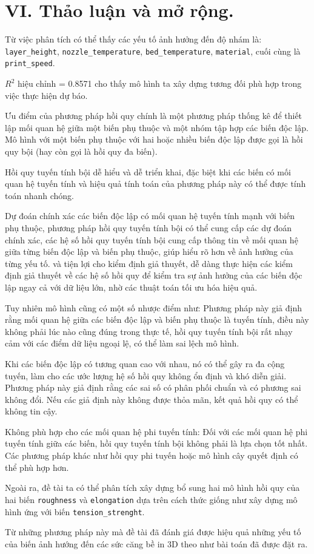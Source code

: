 \section{VI. Thảo luận và mở
rộng.}\label{vi.-thux1ea3o-luux1eadn-vuxe0-mux1edf-rux1ed9ng.}

Từ việc phân tích có thể thấy các yếu tố ảnh hưởng đến độ nhám là:
\texttt{layer\_height}, \texttt{nozzle\_temperature},
\texttt{bed\_temperature}, \texttt{material}, cuối cùng là
\texttt{print\_speed}.

\(R^2\) hiệu chỉnh = 0.8571 cho thấy mô hình ta xây dựng tương đối phù
hợp trong việc thực hiện dự báo.

Ưu điểm của phương pháp hồi quy chính là một phương pháp thống kê để
thiết lập mối quan hệ giữa một biến phụ thuộc và một nhóm tập hợp các
biến độc lập. Mô hình với một biến phụ thuộc với hai hoặc nhiều biến độc
lập được gọi là hồi quy bội (hay còn gọi là hồi quy đa biến).

Hồi quy tuyến tính bội dễ hiểu và dễ triển khai, đặc biệt khi các biến
có mối quan hệ tuyến tính và hiệu quả tính toán của phương pháp này có
thể được tính toán nhanh chóng.

Dự đoán chính xác các biến độc lập có mối quan hệ tuyến tính mạnh với
biến phụ thuộc, phương pháp hồi quy tuyến tính bội có thể cung cấp các
dự đoán chính xác, các hệ số hồi quy tuyến tính bội cung cấp thông tin
về mối quan hệ giữa từng biến độc lập và biến phụ thuộc, giúp hiểu rõ
hơn về ảnh hưởng của từng yếu tố. và tiện lợi cho kiểm định giả thuyết,
dễ dàng thực hiện các kiểm định giả thuyết về các hệ số hồi quy để kiểm
tra sự ảnh hưởng của các biến độc lập ngay cả với dữ liệu lớn, nhờ các
thuật toán tối ưu hóa hiệu quả.

Tuy nhiên mô hình cũng có một số nhược điểm như: Phương pháp này giả
định rằng mối quan hệ giữa các biến độc lập và biến phụ thuộc là tuyến
tính, điều này không phải lúc nào cũng đúng trong thực tế, hồi quy tuyến
tính bội rất nhạy cảm với các điểm dữ liệu ngoại lệ, có thể làm sai lệch
mô hình.

Khi các biến độc lập có tương quan cao với nhau, nó có thể gây ra đa
cộng tuyến, làm cho các ước lượng hệ số hồi quy không ổn định và khó
diễn giải. Phương pháp này giả định rằng các sai số có phân phối chuẩn
và có phương sai không đổi. Nếu các giả định này không được thỏa mãn,
kết quả hồi quy có thể không tin cậy.

Không phù hợp cho các mối quan hệ phi tuyến tính: Đối với các mối quan
hệ phi tuyến tính giữa các biến, hồi quy tuyến tính bội không phải là
lựa chọn tốt nhất. Các phương pháp khác như hồi quy phi tuyến hoặc mô
hình cây quyết định có thể phù hợp hơn.

Ngoài ra, đề tài ta có thể phân tích xây dựng bổ sung hai mô hình hồi
quy của hai biến \texttt{roughness} và \texttt{elongation} dựa trên cách
thức giống như xây dựng mô hình ứng với biến \texttt{tension\_strenght}.

Từ những phương pháp này mà đề tài đã đánh giá được hiệu quả những yếu
tố của biến ảnh hướng đến các sức căng bề in 3D theo như bài toán đã
được đặt ra.
\newpage
